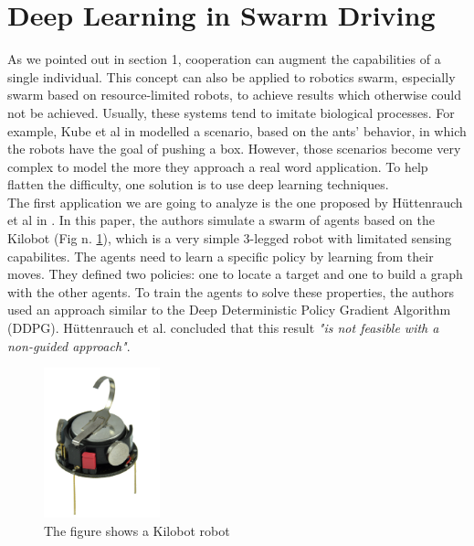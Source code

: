 \documentclass[conference]{IEEEtran}
\begin{document}
\section{Deep  Learning in Swarm Driving}
As we pointed out in section 1, cooperation can augment the capabilities of a single individual. This concept can also be applied to robotics swarm, especially swarm based on resource-limited robots, to achieve results which otherwise could not be achieved. Usually, these systems tend to imitate biological processes. For example,  Kube et al in \cite{KUBE200085} modelled a scenario, based on the ants' behavior,  in which the robots have the goal of pushing a box. However, those scenarios become very complex to model the more they approach a real word application. To help flatten the difficulty, one solution is to use deep learning techniques. \\
The first application we are going to analyze is the one proposed by Hüttenrauch et al in \cite{guided}. In this paper, the authors simulate a swarm of agents based on the Kilobot (Fig n. \ref{fig:kilobot}), which is a very simple 3-legged robot with limitated sensing capabilites. 
The agents need to learn a specific policy by learning from their moves. 
They defined two policies: one to locate a target and one to build a graph with the other agents. To train the agents to solve these properties, the authors used an approach similar to the Deep Deterministic Policy Gradient Algorithm (DDPG). Hüttenrauch et al. concluded that this result \textit{"is not feasible with a non-guided approach"}. \cite{guided}\\
\begin{figure}[htb]
    \centering
    \includegraphics[width=0.3\textwidth]{img/Kilobot.png}
    \caption{The figure shows a Kilobot robot \cite{guided} }
    \label{fig:kilobot}
\end{figure}
\end{document}
